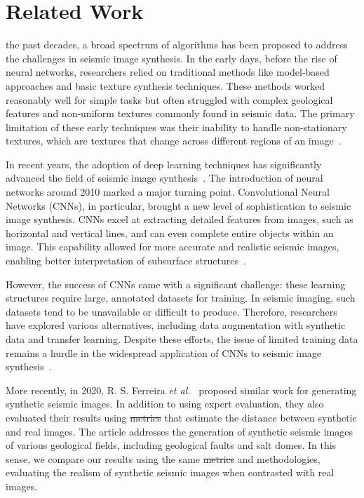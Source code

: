 \documentclass{ieeeaccess}
\makeatletter
\providecommand{\DIFaddtex}[1]{{\protect\color{blue}\uwave{#1}}} %
\providecommand{\DIFdeltex}[1]{{\protect\color{red}\sout{#1}}} %
\providecommand{\DIFaddbegin}{} %
\providecommand{\DIFaddend}{} %
\providecommand{\DIFdelbegin}{} %
\providecommand{\DIFdelend}{} %
\providecommand{\DIFadd}[1]{\texorpdfstring{\DIFaddtex{#1}}{#1}} %
\providecommand{\DIFdel}[1]{\texorpdfstring{\DIFdeltex{#1}}{}} %
\newcommand{\DIFscaledelfig}{0.5}
\newlength{\DIFdelgraphicswidth} %
\newlength{\DIFdelgraphicsheight} %
\newcommand{\DIFaddincludegraphics}[2][]{{\color{blue}\fbox{\DIFOincludegraphics[#1]{#2}}}} %
\newcommand{\DIFdelincludegraphics}[2][]{%
\sbox{\DIFdelgraphicsbox}{\DIFOincludegraphics[#1]{#2}}%
\settoboxwidth{\DIFdelgraphicswidth}{\DIFdelgraphicsbox} %
\settoboxtotalheight{\DIFdelgraphicsheight}{\DIFdelgraphicsbox} %
\scalebox{\DIFscaledelfig}{%
\parbox[b]{\DIFdelgraphicswidth}{\usebox{\DIFdelgraphicsbox}\\[-\baselineskip] \rule{\DIFdelgraphicswidth}{0em}}\llap{\resizebox{\DIFdelgraphicswidth}{\DIFdelgraphicsheight}{%
\setlength{\unitlength}{\DIFdelgraphicswidth}%
\begin{picture}(1,1)%
\thicklines\linethickness{2pt} %
{\color[rgb]{1,0,0}\put(0,0){\framebox(1,1){}}}%
{\color[rgb]{1,0,0}\put(0,0){\line( 1,1){1}}}%
{\color[rgb]{1,0,0}\put(0,1){\line(1,-1){1}}}%
\end{picture}%
}\hspace*{3pt}}} %
} %
\DeclareRobustCommand{\DIFaddbegin}{\DIFOaddbegin \let\includegraphics\DIFaddincludegraphics} %
\DeclareRobustCommand{\DIFaddend}{\DIFOaddend \let\includegraphics\DIFOincludegraphics} %
\DeclareRobustCommand{\DIFdelbegin}{\DIFOdelbegin \let\includegraphics\DIFdelincludegraphics} %
\DeclareRobustCommand{\DIFdelend}{\DIFOaddend \let\includegraphics\DIFOincludegraphics} %
\let\sout@orig\sout %
\renewcommand{\sout}[1]{\ifmmode\text{\sout@orig{\ensuremath{#1}}}\else\sout@orig{#1}\fi} %
\makeatother
\begin{document}
\section{Related Work}
\label{sec:related}

 the past decades, a broad spectrum of algorithms has been proposed to address the challenges in seismic image synthesis. In the early days, before the rise of neural networks, researchers relied on traditional methods like model-based approaches and basic texture synthesis techniques. These methods worked reasonably well for simple tasks but often struggled with complex geological features and non-uniform textures commonly found in seismic data. The primary limitation of these early techniques was their inability to handle non-stationary textures, which are textures that change across different regions of an image~\cite{Zhou2018}.

In recent years, the adoption of deep learning techniques has significantly advanced the field of seismic image synthesis~\cite{Zeng2019}. The introduction of neural networks around 2010 marked a major turning point. Convolutional Neural Networks (CNNs), in particular, brought a new level of sophistication to seismic image synthesis. CNNs excel at extracting detailed features from images, such as horizontal and vertical lines, and can even complete entire objects within an image. This capability allowed for more accurate and realistic seismic images, enabling better interpretation of subsurface structures~\cite{Powers2011}. 

However, the success of CNNs came with a significant challenge: these learning structures require large, annotated datasets for training. In seismic imaging, such datasets tend to be unavailable or difficult to produce. Therefore, researchers have explored various alternatives, including data augmentation with synthetic data and transfer learning. Despite these efforts, the issue of limited training data remains a hurdle in the widespread application of CNNs to seismic image synthesis~\cite{Wang2021}.

More recently, in 2020, R. S. Ferreira \emph{et al.}~\cite{Ferreira2020} proposed similar work for generating synthetic seismic images. In addition to using expert evaluation, they also evaluated their results using \DIFdelbegin \DIFdel{metrics }\DIFdelend \DIFaddbegin \DIFadd{measures }\DIFaddend that estimate the distance between synthetic and real images. The article addresses the generation of synthetic seismic images of various geological fields, including geological faults and salt domes. In this sense, we compare our results using the same \DIFdelbegin \DIFdel{metrics }\DIFdelend \DIFaddbegin \DIFadd{measures }\DIFaddend and methodologies, evaluating the realism of synthetic seismic images when contrasted with real images.
\end{document}

